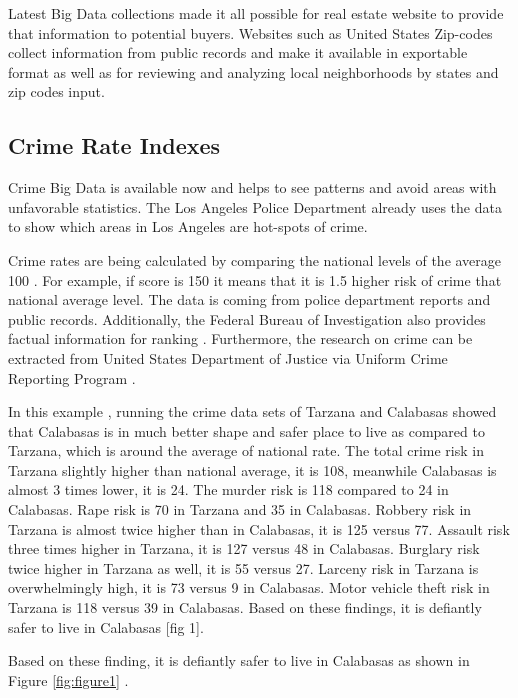 \documentclass[sigconf]{acmart}
\begin{document}
Latest Big Data collections made it all possible for real estate website to provide that information to potential buyers. Websites such as United States Zip-codes \cite{zipcodes} collect information from public records and make it available in exportable format as well as for reviewing and analyzing local neighborhoods by states and zip codes input. 

\subsection{Crime Rate Indexes}

Crime Big Data is available now and helps to see patterns and avoid areas with unfavorable statistics. The Los Angeles Police Department \cite{federal} already uses the data to show which areas in Los Angeles are hot-spots of crime.

Crime rates are being calculated by comparing the national levels of the average 100 \cite{crime}. For example, if score is 150 it means that it is 1.5 higher risk of crime that national average level. The data is coming from police department reports and public records. Additionally, the Federal Bureau of Investigation also provides factual information for ranking \cite{crime2}. Furthermore, the research on crime can be extracted from United States Department of Justice via Uniform Crime Reporting Program  \cite{unicrime}.

In this example \cite{md}, running the crime data sets of Tarzana and Calabasas showed that Calabasas is in much better shape and safer place to live as compared to Tarzana, which is around the average of national rate. The total crime risk in Tarzana slightly higher than national average, it is 108, meanwhile Calabasas is almost 3 times lower, it is 24. The murder risk is 118 compared to 24 in Calabasas. Rape risk is 70 in Tarzana and 35 in Calabasas. Robbery risk in Tarzana is almost twice higher than in Calabasas, it is 125 versus 77. Assault risk three times higher in Tarzana, it is 127 versus 48 in Calabasas. Burglary risk twice higher in Tarzana as well, it is 55 versus 27. Larceny risk in Tarzana is overwhelmingly high, it is 73 versus 9 in Calabasas. Motor vehicle theft risk in Tarzana is 118 versus 39 in Calabasas. Based on these findings, it is defiantly safer to live in Calabasas [fig 1].

Based on these finding, it is defiantly safer to live in Calabasas as shown in Figure \ref{fig:figure1} \cite{md}.
\end{document}
